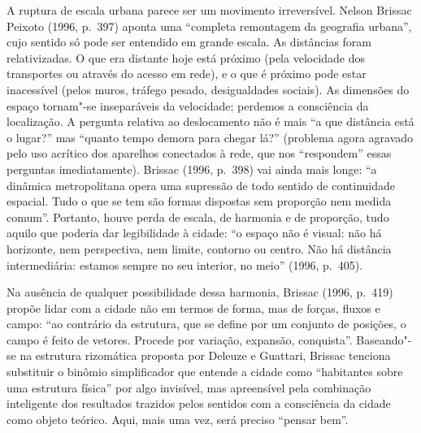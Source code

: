 A ruptura de escala urbana parece ser um movimento irreversível. Nelson
Brissac Peixoto (1996, p.~397) aponta uma ``completa remontagem da
geografia urbana'', cujo sentido só pode ser entendido em grande escala.
As distâncias foram relativizadas. O que era distante hoje está próximo
(pela velocidade dos transportes ou através do acesso em rede), e o que
é próximo pode estar inacessível (pelos muros, tráfego pesado,
desigualdades sociais). As dimensões do espaço tornam"-se inseparáveis da
velocidade; perdemos a consciência da localização. A pergunta relativa
ao deslocamento não é mais ``a que distância está o lugar?'' mas
``quanto tempo demora para chegar lá?'' (problema agora agravado pelo
uso acrítico dos aparelhos conectados à rede, que nos ``respondem''
essas perguntas imediatamente). Brissac (1996, p.~398) vai ainda mais longe: ``a
dinâmica metropolitana opera uma supressão de todo sentido de
continuidade espacial. Tudo o que se tem são formas dispostas sem
proporção nem medida comum''. Portanto, houve perda de
escala, de harmonia e de proporção, tudo aquilo que poderia dar
legibilidade à cidade: ``o espaço não é visual: não há horizonte, nem
perspectiva, nem limite, contorno ou centro. Não há distância
intermediária: estamos sempre no seu interior, no meio'' (1996, p.~405).

Na ausência de qualquer possibilidade dessa harmonia, Brissac (1996,
p.~419) propõe lidar com a cidade não em termos de forma, mas de forças,
fluxos e campo: ``ao contrário da estrutura, que se define por um
conjunto de posições, o campo é feito de vetores. Procede por variação,
expansão, conquista''. Baseando"-se na estrutura rizomática proposta por
Deleuze e Guattari, Brissac tenciona substituir o binômio
simplificador que entende a cidade como ``habitantes sobre uma estrutura
física'' por algo invisível, mas apreensível pela combinação inteligente
dos resultados trazidos pelos sentidos com a consciência da cidade como
objeto teórico. Aqui, mais uma vez, será preciso ``pensar bem''.

